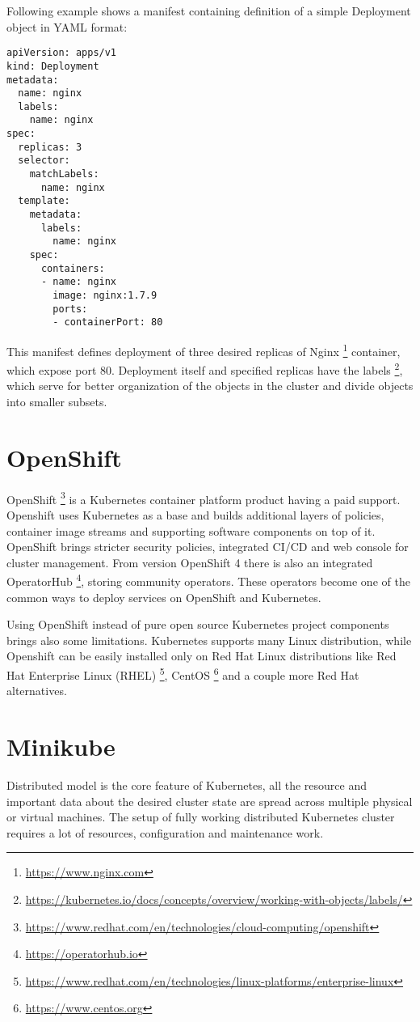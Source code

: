 \documentclass[
  digital, %
  twoside, %
  table,   %
  lof,     %
  lot,     %
]{fithesis3}
\begin{document}
Following example shows a manifest containing definition of a simple Deployment object in YAML format:
\begin{lstlisting}
apiVersion: apps/v1
kind: Deployment
metadata:
  name: nginx
  labels:
    name: nginx
spec:
  replicas: 3
  selector:
    matchLabels:
      name: nginx
  template:
    metadata:
      labels:
        name: nginx
    spec:
      containers:
      - name: nginx
        image: nginx:1.7.9
        ports:
        - containerPort: 80
\end{lstlisting}

This manifest defines deployment of three desired replicas of Nginx \footnote{\url{https://www.nginx.com}} container, which expose port 80. Deployment itself and specified replicas have the labels \footnote{\url{https://kubernetes.io/docs/concepts/overview/working-with-objects/labels/}}, which serve for better organization of the objects in the cluster and divide objects into smaller subsets.

\section{OpenShift} \label{sec:openshift}
OpenShift \footnote{\url{https://www.redhat.com/en/technologies/cloud-computing/openshift}} is a Kubernetes container platform product having a paid support. Openshift uses Kubernetes as a base and builds additional layers of policies, container image streams and supporting software components on top of it. OpenShift brings stricter security policies, integrated CI/CD and web console for cluster management. From version OpenShift 4 there is also an integrated OperatorHub \footnote{\url{https://operatorhub.io}}, storing community operators. These operators become one of the common ways to deploy services on OpenShift and Kubernetes.

Using OpenShift instead of pure open source Kubernetes project components brings also some limitations. Kubernetes supports many Linux distribution, while Openshift can be easily installed only on Red Hat Linux distributions like Red Hat Enterprise Linux (RHEL) \footnote{\url{https://www.redhat.com/en/technologies/linux-platforms/enterprise-linux}}, CentOS \footnote{\url{https://www.centos.org}} and a couple more Red Hat alternatives.

\section{Minikube}
Distributed model is the core feature of Kubernetes, all the resource and important data about the desired cluster state are spread across multiple physical or virtual machines. The setup of fully working distributed Kubernetes cluster requires a lot of resources, configuration and maintenance work.
\end{document}
